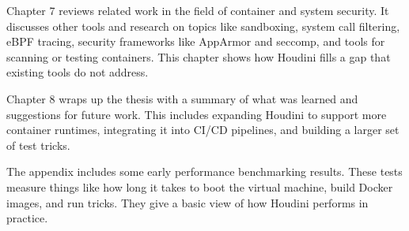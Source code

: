 \documentclass[12pt]{report}
\begin{document}
\begin{doublespace}
Chapter 7 reviews related work in the field of container and system security. It discusses other tools and research on topics like sandboxing, system call filtering, eBPF tracing, security frameworks like AppArmor and seccomp, and tools for scanning or testing containers. This chapter shows how Houdini fills a gap that existing tools do not address.

Chapter 8 wraps up the thesis with a summary of what was learned and suggestions for future work. This includes expanding Houdini to support more container runtimes, integrating it into CI/CD pipelines, and building a larger set of test tricks.

The appendix includes some early performance benchmarking results. These tests measure things like how long it takes to boot the virtual machine, build Docker images, and run tricks. They give a basic view of how Houdini performs in practice.



\end{doublespace} 	\fontsize{12pt}{14pt} \selectfont
\end{document}
